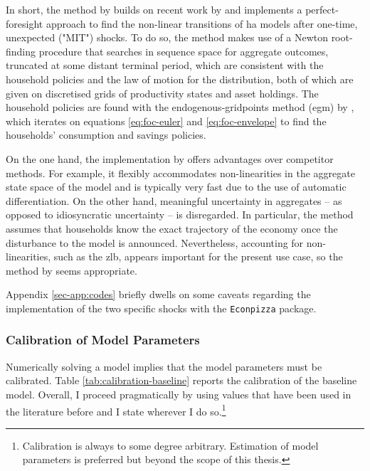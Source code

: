 \documentclass[12pt]{article} %
\numberwithin{equation}{section} %
\numberwithin{figure}{section}
\numberwithin{table}{section}
\begin{document}
In short, the method by \textcite{boehl2023econpizza} builds on recent work by \textcite{auclert2021} and implements a perfect-foresight approach to find the non-linear transitions of \Gls{ha} models after one-time, unexpected ("MIT") shocks. To do so, the method makes use of a Newton root-finding procedure that searches in sequence space for aggregate outcomes, truncated at some distant terminal period, which are consistent with the household policies and the law of motion for the distribution, both of which are given on discretised grids of productivity states and asset holdings. The household policies are found with the endogenous-gridpoints method (\Gls{egm}) by \textcite{carroll2006}, which iterates on equations \eqref{eq:foc-euler} and \eqref{eq:foc-envelope} to find the households' consumption and savings policies.

On the one hand, the implementation by \textcite{boehl2023econpizza} offers advantages over competitor methods. For example, it flexibly accommodates non-linearities in the aggregate state space of the model and is typically very fast due to the use of automatic differentiation. On the other hand, meaningful uncertainty in aggregates -- as opposed to idiosyncratic uncertainty -- is disregarded. In particular, the method assumes that households know the exact trajectory of the economy once the disturbance to the model is announced. Nevertheless, accounting for non-linearities, such as the \Gls{zlb}, appears important for the present use case, so the method by \textcite{boehl2023econpizza} seems appropriate.

Appendix \ref{sec-app:codes} briefly dwells on some caveats regarding the implementation of the two specific shocks with the \texttt{Econpizza} package.

\subsubsection*{Calibration of Model Parameters}

Numerically solving a model implies that the model parameters must be calibrated. Table \ref{tab:calibration-baseline} reports the calibration of the baseline model. Overall, I proceed pragmatically by using values that have been used in the literature before and I state wherever I do so.\footnote{Calibration is always to some degree arbitrary. Estimation of model parameters is preferred but beyond the scope of this thesis.}
\end{document}
